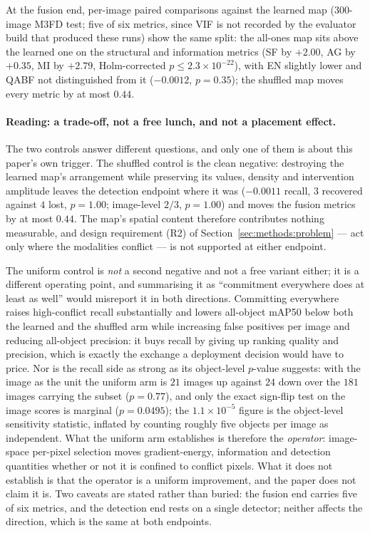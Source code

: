 \documentclass[pdflatex,sn-mathphys-num]{sn-jnl}
\theoremstyle{thmstyleone}%
\theoremstyle{thmstyletwo}%
\theoremstyle{thmstylethree}%
\begin{document}
At the fusion end, per-image paired comparisons against the learned map (300-image M3FD test; five of six metrics, since VIF is not recorded by the evaluator build that produced these runs) show the same split: the all-ones map sits above the learned one on the structural and information metrics (SF by $+2.00$, AG by $+0.35$, MI by $+2.79$, Holm-corrected $p \leq 2.3\times10^{-22}$), with EN slightly lower and QABF not distinguished from it ($-0.0012$, $p = 0.35$); the shuffled map moves every metric by at most $0.44$.

\paragraph{Reading: a trade-off, not a free lunch, and not a placement effect.}
The two controls answer different questions, and only one of them is about this paper's own trigger. The shuffled control is the clean negative: destroying the learned map's arrangement while preserving its values, density and intervention amplitude leaves the detection endpoint where it was ($-0.0011$ recall, $3$ recovered against $4$ lost, $p = 1.00$; image-level $2/3$, $p = 1.00$) and moves the fusion metrics by at most $0.44$. The map's spatial content therefore contributes nothing measurable, and design requirement (R2) of Section~\ref{sec:methods:problem} --- act only where the modalities conflict --- is not supported at either endpoint.

The uniform control is \emph{not} a second negative and not a free variant either; it is a different operating point, and summarising it as ``commitment everywhere does at least as well'' would misreport it in both directions. Committing everywhere raises high-conflict recall substantially and lowers all-object mAP50 below both the learned and the shuffled arm while increasing false positives per image and reducing all-object precision: it buys recall by giving up ranking quality and precision, which is exactly the exchange a deployment decision would have to price. Nor is the recall side as strong as its object-level $p$-value suggests: with the image as the unit the uniform arm is $21$ images up against $24$ down over the $181$ images carrying the subset ($p = 0.77$), and only the exact sign-flip test on the image scores is marginal ($p = 0.0495$); the $1.1\times10^{-5}$ figure is the object-level sensitivity statistic, inflated by counting roughly five objects per image as independent. What the uniform arm establishes is therefore the \emph{operator}: image-space per-pixel selection moves gradient-energy, information and detection quantities whether or not it is confined to conflict pixels. What it does not establish is that the operator is a uniform improvement, and the paper does not claim it is. Two caveats are stated rather than buried: the fusion end carries five of six metrics, and the detection end rests on a single detector; neither affects the direction, which is the same at both endpoints.
\end{document}
